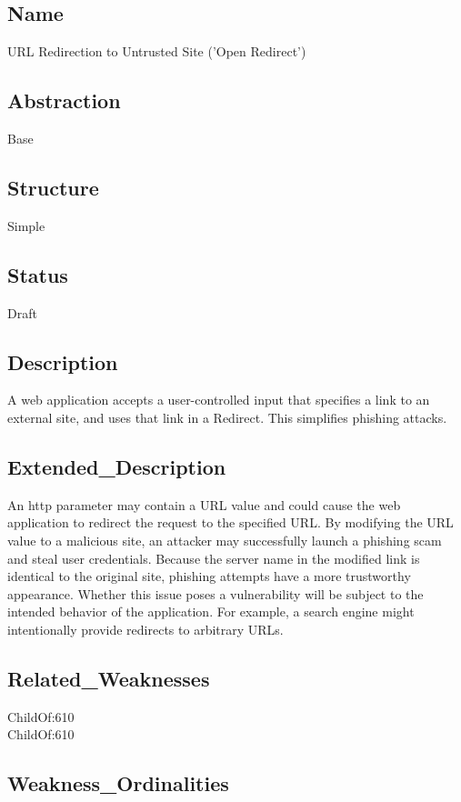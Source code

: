 \subsection*{Name}
URL Redirection to Untrusted Site ('Open Redirect')

\subsection*{Abstraction}
Base

\subsection*{Structure}
Simple

\subsection*{Status}
Draft

\subsection*{Description}
A web application accepts a user-controlled input that specifies a link to an external site, and uses that link in a Redirect. This simplifies phishing attacks.

\subsection*{Extended\_Description}
An http parameter may contain a URL value and could cause the web application to redirect the request to the specified URL. By modifying the URL value to a malicious site, an attacker may successfully launch a phishing scam and steal user credentials. Because the server name in the modified link is identical to the original site, phishing attempts have a more trustworthy appearance. Whether this issue poses a vulnerability will be subject to the intended behavior of the application. For example, a search engine might intentionally provide redirects to arbitrary URLs.

\subsection*{Related\_Weaknesses}
ChildOf:610\\
ChildOf:610\\
\subsection*{Weakness\_Ordinalities}
